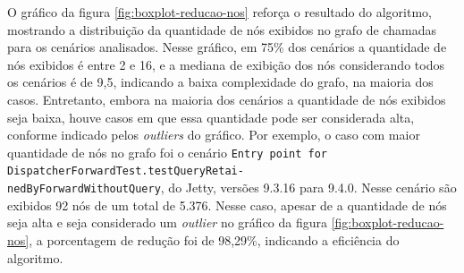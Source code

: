 O gráfico da figura \ref{fig:boxplot-reducao-nos} reforça o resultado do algoritmo, mostrando a distribuição da quantidade de nós exibidos no grafo de chamadas para os cenários analisados. Nesse gráfico, em 75\% dos cenários a quantidade de nós exibidos é entre 2 e 16, e a mediana de exibição dos nós considerando todos os cenários é de 9,5, indicando a baixa complexidade do grafo, na maioria dos casos. Entretanto, embora na maioria dos cenários a quantidade de nós exibidos seja baixa, houve casos em que essa quantidade pode ser considerada alta, conforme indicado pelos \textit{outliers} do gráfico. Por exemplo, o caso com maior quantidade de nós no grafo foi o cenário \texttt{Entry point for DispatcherForwardTest.testQueryRetai-\\nedByForwardWithoutQuery}, do Jetty, versões 9.3.16 para 9.4.0. Nesse cenário são exibidos 92 nós de um total de 5.376. Nesse caso, apesar de a quantidade de nós seja alta e seja considerado um \textit{outlier} no gráfico da figura \ref{fig:boxplot-reducao-nos}, a porcentagem de redução foi de 98,29\%, indicando a eficiência do algoritmo.

